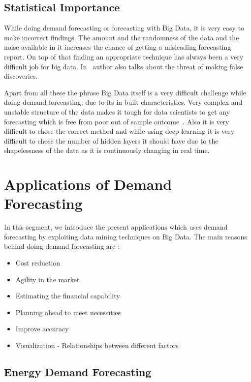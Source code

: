 \subsection{Statistical Importance}
\label{Statistics}

While doing demand forecasting or forecasting with Big Data, it is very easy to make incorrect findings. The amount and the randomness of the data and the noise available in it increases the chance of getting a misleading forecasting report. On top of that finding an appropriate technique has always been a very difficult job for big data. In~\cite{lohr2012age} author also talks about the threat of making false discoveries. 

Apart from all these the phrase Big Data itself is a very difficult challenge while doing demand forecasting, due to its in-built characteristics. Very complex and unstable structure of the data makes it tough for data scientists to get any forecasting which is free from poor out of sample outcome~\cite{einav2014data}. Also it is very difficult to chose the correct method and while using deep learning it is very difficult to chose the number of hidden layers it should have due to the shapelessness of the data as it is continuously changing in real time. 



\section{Applications of Demand Forecasting}
\label{Application}

In this segment, we introduce the present applications which uses demand forecasting by exploiting data mining techniques on Big Data. The main reasons behind doing demand forecasting are :


\begin{itemize}
\item Cost reduction
\item Agility in the market
\item Estimating the financial capability
\item Planning ahead to meet necessities
\item Improve accuracy
\item Visualization - Relationships between different factors


\end{itemize}


\subsection{Energy Demand Forecasting}
\label{Energy}


